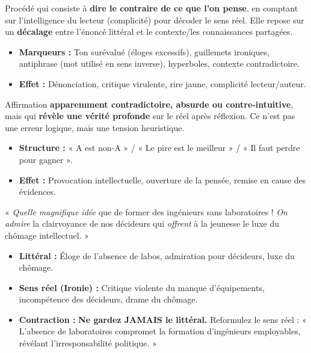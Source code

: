 \documentclass[11pt]{article}
\begin{document}
\begin{definition}[Ironie]
Procédé qui consiste à \textbf{dire le contraire de ce que l'on pense}, en comptant sur l'intelligence du lecteur (complicité) pour décoder le sens réel. Elle repose sur un \textbf{décalage} entre l'énoncé littéral et le contexte/les connaissances partagées.
\begin{itemize}
    \item \textbf{Marqueurs :} Ton surévalué (éloges excessifs), guillemets ironiques, antiphrase (mot utilisé en sens inverse), hyperboles, contexte contradictoire.
    \item \textbf{Effet :} Dénonciation, critique virulente, rire jaune, complicité lecteur/auteur.
\end{itemize}
\end{definition}

\begin{definition}[Paradoxe]
Affirmation \textbf{apparemment contradictoire, absurde ou contre-intuitive}, mais qui \textbf{révèle une vérité profonde} sur le réel après réflexion. Ce n'est pas une erreur logique, mais une tension heuristique.
\begin{itemize}
    \item \textbf{Structure :} « A est non-A » / « Le pire est le meilleur » / « Il faut perdre pour gagner ».
    \item \textbf{Effet :} Provocation intellectuelle, ouverture de la pensée, remise en cause des évidences.
\end{itemize}
\end{definition}

\begin{exemplebox}
« \emph{Quelle magnifique idée} que de former des ingénieurs sans laboratoires ! \emph{On admire} la clairvoyance de nos décideurs qui \emph{offrent} à la jeunesse le luxe du chômage intellectuel. »
\begin{itemize}
    \item \textbf{Littéral :} Éloge de l'absence de labos, admiration pour décideurs, luxe du chômage.
    \item \textbf{Sens réel (Ironie) :} Critique violente du manque d'équipements, incompétence des décideurs, drame du chômage.
    \item \textbf{Contraction :} \textbf{Ne gardez JAMAIS le littéral.} Reformulez le sens réel : « L'absence de laboratoires compromet la formation d'ingénieurs employables, révélant l'irresponsabilité politique. »
\end{itemize}
\end{exemplebox}
\end{document}
